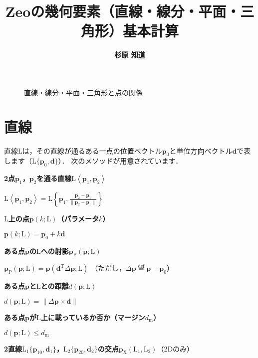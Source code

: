﻿\documentclass[a4paper]{jsarticle}
\title{\bf Zeoの幾何要素（直線・線分・平面・三角形）基本計算}
\author{\Large{\bf 杉原 知道}}
\date{}
\begin{document}
\maketitle
\vspace{-\baselineskip}

\begin{figure}[h]
\begin{center}

\label{fig:line_edge_plane_tri}
\caption{直線・線分・平面・三角形と点の関係}
\end{center}
\end{figure}

\section{直線}

直線$\mathrm{L}$は，その直線が通るある一点の位置ベクトル$\bm{p}_{0}$と単位方向ベクトル$\bm{d}$で表します（$\mathrm{L}\{\bm{p}_{0},\bm{d}\}$）．
次のメソッドが用意されています．

{\bf 2点$\bm{p}_{1}$，$\bm{p}_{2}$を通る直線$\mathrm{L}\left<\bm{p}_{1},\bm{p}_{2}\right>$} 

$\mathrm{L}\left<\bm{p}_{1},\bm{p}_{2}\right>
=\mathrm{L}\left\{\bm{p}_{1},\frac{\bm{p}_{2}-\bm{p}_{1}}{\|\bm{p}_{2}-\bm{p}_{1}\|}\right\}$

{\bf $\mathrm{L}$上の点$\bm{p}(k;\mathrm{L})$（パラメータ$k$）}

$\bm{p}(k;\mathrm{L})=\bm{p}_{0}+k\bm{d}$

{\bf ある点$\bm{p}$の$\mathrm{L}$への射影$\bm{p}_{\mathrm{P}}(\bm{p};\mathrm{L})$}

$\bm{p}_{\mathrm{P}}(\bm{p};\mathrm{L})=\bm{p}(\bm{d}^{\mathrm{T}}\varDelta\bm{p};\mathrm{L})$
（ただし，$\varDelta\bm{p}\overset{\mathrm{def}}{=}\bm{p}-\bm{p}_{0}$）

{\bf ある点$\bm{p}$と$\mathrm{L}$との距離$d(\bm{p};\mathrm{L})$}

$d(\bm{p};\mathrm{L})=\|\varDelta\bm{p}\times\bm{d}\|$

{\bf ある点$\bm{p}$が$\mathrm{L}$上に載っているか否か（マージン$d_{\mathrm{m}}$）}

$d(\bm{p};\mathrm{L})\leq d_{\mathrm{m}}$

{\bf 2直線$\mathrm{L}_{1}\{\bm{p}_{10},\bm{d}_{1}\}$，$\mathrm{L}_{2}\{\bm{p}_{20},\bm{d}_{2}\}$の交点$\bm{p}_{\mathrm{X}}(\mathrm{L}_{1},\mathrm{L}_{2})$}（2Dのみ）
\end{document}
